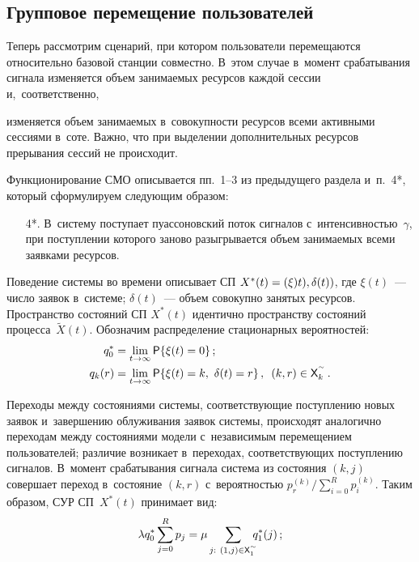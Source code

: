 \begin{multicols}{2}
\section{Групповое перемещение пользователей}

  Теперь рассмотрим сценарий, при котором пользователи перемещаются 
относительно базовой  станции совместно. В~этом случае в~момент 
срабатывания сигнала изменяется объем занимаемых ресурсов каждой сессии 
и,~соответственно,\linebreak\vspace*{-12pt}

\pagebreak

\noindent
 изменяется объем занимаемых в~совокупности ресурсов 
всеми активными сессиями в~соте. Важно, что при выделении 
дополнительных ресурсов прерывания сессий не происходит.
  
  Функционирование СМО описывается пп.~1--3 из предыдущего 
раздела и~п.~4*, который сформулируем следующим образом:
  \begin{itemize}
  \item[4*.] В~систему поступает пуассоновский поток сигналов 
с~интенсивностью~$\gamma$, при поступлении которого заново 
разыгрывается объем занимаемых всеми заявками ресурсов. 
\end{itemize}
  
Поведение системы во времени описывает СП $X^*(t)\hm= \left( \xi)t), 
\delta(t)\right)$, где $\xi(t)$~--- число заявок в~сис\-те\-ме; $\delta(t)$~--- объем 
совокупно занятых ресурсов. Пространство состояний СП $X^*(t)$ 
идентично пространству состояний процесса~$\tilde{X}(t)$. Обозначим 
распределение стационарных вероятностей:
\begin{align*}
q_0^* &= \lim\limits_{t\to\infty} {\sf P}\{\xi(t)=0\}\,;\\
q_k(r) &= \lim\limits_{t\to\infty} {\sf P}\{ \xi(t)=k,\ \delta(t)=r\}\,,\enskip (k,r)\in {\sf 
X}_k^{\sptilde}\,.
\end{align*}
  
  Переходы между состояниями системы, соответствующие поступлению 
новых заявок и~завершению облуживания заявок системы, происходят 
аналогично переходам между состояниями модели с~независимым 
перемещением пользователей; различие возникает в~переходах, 
соответствующих поступлению сигналов. В~момент срабатывания сигнала 
система из состояния $(k,j)$ совершает переход в~состояние $(k,r)$ 
с~вероятностью $p_r^{(k)}/\sum\nolimits_{i=0}^R p_i^{(k)}$. Таким образом, 
СУР СП~$X^*(t)$ принимает вид:
  \begin{equation}
  \lambda q_0^*\sum\limits^R_{j=0} p_j =\mu \sum\limits_{j:\ (1,j)\in{\sf 
X}_1^{\sptilde} }\hspace*{-2mm} q_1^*(j)\,;
  \label{e13-sop}
  \end{equation}
  

\end{multicols}
